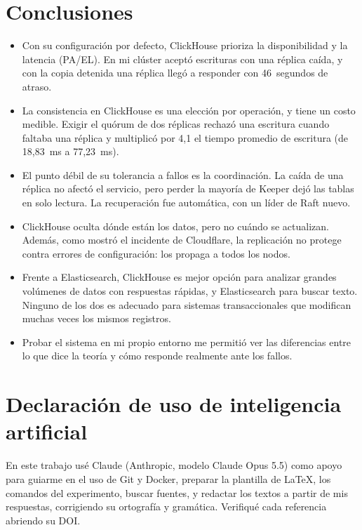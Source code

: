 \documentclass[12pt,a4paper]{article}
\begin{document}
\section{Conclusiones}

\begin{itemize}
  \item Con su configuración por defecto, ClickHouse prioriza la
    disponibilidad y la latencia (PA/EL). En mi clúster aceptó escrituras
    con una réplica caída, y con la copia detenida una réplica llegó a
    responder con 46~segundos de atraso.
  \item La consistencia en ClickHouse es una elección por operación, y
    tiene un costo medible. Exigir el quórum de dos réplicas rechazó una
    escritura cuando faltaba una réplica y multiplicó por 4,1 el tiempo
    promedio de escritura (de 18,83~ms a 77,23~ms).
  \item El punto débil de su tolerancia a fallos es la coordinación. La
    caída de una réplica no afectó el servicio, pero perder la mayoría de
    Keeper dejó las tablas en solo lectura. La recuperación fue
    automática, con un líder de Raft nuevo.
  \item ClickHouse oculta dónde están los datos, pero no cuándo se
    actualizan. Además, como mostró el incidente de Cloudflare, la
    replicación no protege contra errores de configuración: los propaga
    a todos los nodos.
  \item Frente a Elasticsearch, ClickHouse es mejor opción para analizar
    grandes volúmenes de datos con respuestas rápidas, y Elasticsearch
    para buscar texto. Ninguno de los dos es adecuado para sistemas
    transaccionales que modifican muchas veces los mismos registros.
  \item Probar el sistema en mi propio entorno me permitió ver las
    diferencias entre lo que dice la teoría y cómo responde realmente
    ante los fallos.
\end{itemize}

\section*{Declaración de uso de inteligencia artificial}

En este trabajo usé Claude (Anthropic, modelo Claude Opus 5.5) como
apoyo para guiarme en el uso de Git y Docker, preparar la plantilla de
LaTeX, los comandos del experimento, buscar fuentes, y
redactar los textos a partir de mis respuestas, corrigiendo su
ortografía y gramática. Verifiqué cada referencia abriendo su DOI.
\end{document}
